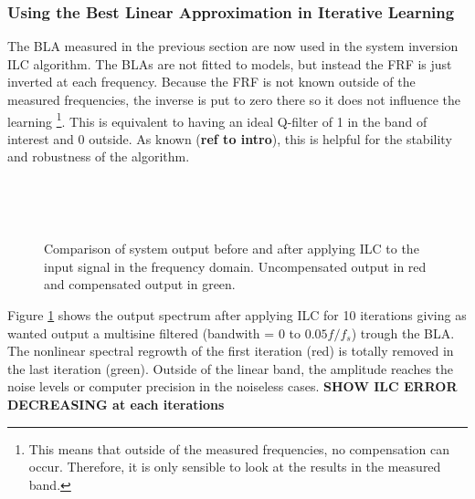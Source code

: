 	\subsubsection{Using the Best Linear Approximation in Iterative Learning}
	The BLA measured in the previous section are now used in the system inversion ILC algorithm. The BLAs are not fitted to models, but instead the FRF is just inverted at each frequency. Because the FRF is not known outside of the measured frequencies, the inverse is put to zero there so it does not influence the learning \footnote{This means that outside of the measured frequencies, no compensation can occur. Therefore, it is only sensible to look at the results in the measured band.}. This is equivalent to having an ideal Q-filter of 1 in the band of interest and 0 outside. As known (\textbf{ref to intro}), this is helpful for the stability and robustness of the algorithm.

			\begin{figure}
				\centering
		        \begin{subfigure}[b]{0.3\textwidth}
		            \centering
		            \setlength\figureheight{3cm} 
					\setlength{}
					

		        \end{subfigure}%
		        ~ 
		        \begin{subfigure}[b]{0.3\textwidth}
		        	\centering
		            \setlength\figureheight{3cm} 
					\setlength{}
					
		        \end{subfigure}
		        ~ 
		        \begin{subfigure}[b]{0.3\textwidth}
		        	\centering
		            \setlength\figureheight{3cm} 
					\setlength{}
					
		        \end{subfigure}
				\caption{Comparison of system output before and after applying ILC to the input signal in the frequency domain. Uncompensated output in red and compensated output in green.}
				\label{fig:sim_outputspec_SNL}
			\end{figure}

	Figure \ref{fig:sim_outputspec_SNL} shows the output spectrum after applying ILC for 10 iterations giving as wanted output a multisine filtered (bandwith = $0$ to $0.05 f/f_s$) trough the BLA.  The nonlinear spectral regrowth of the first iteration (red) is totally removed in the last iteration (green). Outside of the linear band, the amplitude reaches the noise levels or computer precision in the noiseless cases.
	\textbf{SHOW ILC ERROR DECREASING at each iterations}

